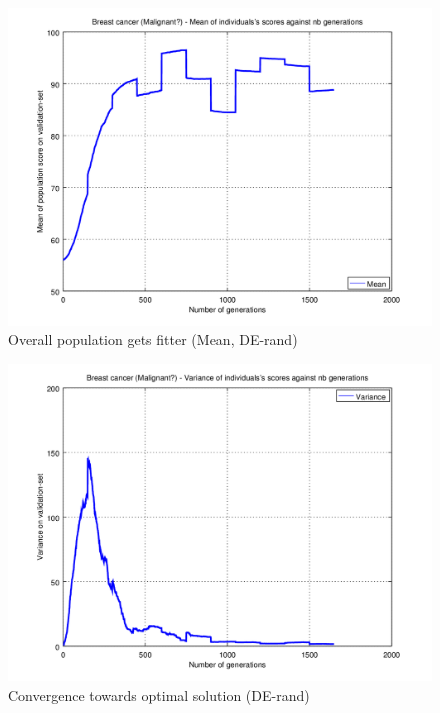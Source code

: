 \documentclass[a4paper,12pt, oneside]{memoir}
\begin{document}
\begin{figure}[h]
  \centering
  \includegraphics[scale=0.7]{malignant-meanVSepochs-DE}
  \vspace{-12pt}
  \caption{Overall population gets fitter (Mean, DE-rand)}
  \label{malignant-mean-DE-rand}
\end{figure}

\begin{figure}[h]
  \centering
  \includegraphics[scale=0.7]{malignant-varianceVSepochs-DE}
  \vspace{-12pt}
  \caption{Convergence towards optimal solution (DE-rand)}
  \label{malignant-variance-DE-rand}
\end{figure}
\end{document}
